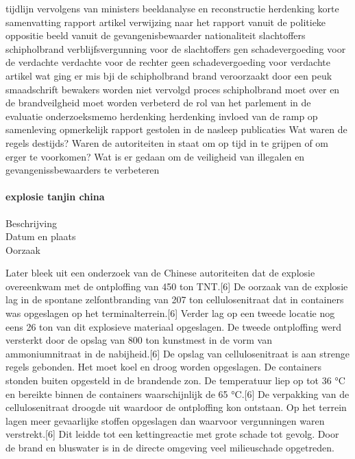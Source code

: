 tijdlijn
\cite{singeluitgeverijenSchipholbrand}
vervolgens van ministers
beeldanalyse en reconstructie
\cite{eenvandaagschipholbrand}
herdenking
korte samenvatting
rapport
artikel
verwijzing naar het rapport vanuit de politieke oppositie
beeld vanuit de gevangenisbewaarder
nationaliteit slachtoffers schipholbrand
verblijfsvergunning voor de slachtoffers
gen schadevergoeding voor de verdachte
verdachte voor de rechter
geen schadevergoeding voor verdachte
artikel wat ging er mis bji de schipholbrand
brand veroorzaakt door een peuk
smaadschrift
bewakers worden niet vervolgd
proces schipholbrand moet over en de brandveilgheid moet worden verbeterd
de rol van het parlement in de evaluatie
\cite{parlementairemonitorschipholbrand}
onderzoeksmemo
herdenking
herdenking
invloed van de ramp op samenleving
\cite{videonpoNOVA13112008}
opmerkelijk rapport gestolen in de nasleep
\cite{rizoomes01052014schipholbrand}
publicaties
\cite{heuvelkroesschipholbrandcamerabeelden}
Wat waren de regels destijds?
Waren de autoriteiten in staat om op tijd in te grijpen of om erger te voorkomen?
Wat is er gedaan om de veiligheid van illegalen en gevangenissbewaarders te verbeteren

\paragraph{explosie tanjin china }

\begin{description}
\item[Beschrijving]
\item[Datum en plaats] 
\item[Oorzaak]
\end{description}

Later bleek uit een onderzoek van de Chinese autoriteiten dat de explosie overeenkwam met de ontploffing van 450 ton TNT.[6] 
De oorzaak van de explosie lag in de spontane zelfontbranding van 207 ton cellulosenitraat dat in containers was opgeslagen op het terminalterrein.[6] 
Verder lag op een tweede locatie nog eens 26 ton van dit explosieve materiaal opgeslagen.
De tweede ontploffing werd versterkt door de opslag van 800 ton kunstmest in de vorm van ammoniumnitraat in de nabijheid.[6]
De opslag van cellulosenitraat is aan strenge regels gebonden. Het moet koel en droog worden opgeslagen. De containers stonden buiten opgesteld in de brandende zon. De temperatuur liep op tot 36 °C en bereikte binnen de containers waarschijnlijk de 65 °C.[6] De verpakking van de cellulosenitraat droogde uit waardoor de ontploffing kon ontstaan. Op het terrein lagen meer gevaarlijke stoffen opgeslagen dan waarvoor vergunningen waren verstrekt.[6] Dit leidde tot een kettingreactie met grote schade tot gevolg. Door de brand en bluswater is in de directe omgeving veel milieuschade opgetreden.


